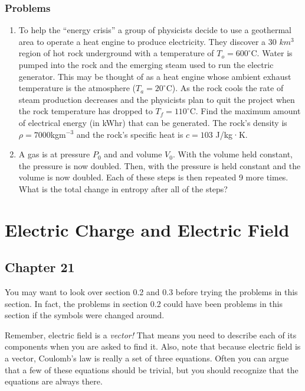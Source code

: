 \documentclass[12pt]{book}
\begin{document}
\subsection{Problems}

\begin{enumerate}
 \item To help the “energy crisis” a group of physicists decide to use a geothermal area to operate a heat engine
to produce electricity. They discover a 30 $km^3$ region of hot rock underground with a temperature of
$T_o = 600^{\circ}$C. Water is pumped into the rock and the emerging steam used to run the electric generator.
This may be thought of as a heat engine whose ambient exhaust temperature is the atmosphere ($T_a =
20^{\circ}$C). As the rock cools the rate of steam production decreases and the physicists plan to quit the project
when the rock temperature has dropped to $T_f = 110^{\circ}$C. Find the maximum amount of electrical energy
(in kWhr) that can be generated. The rock’s density is $\rho = 7000 $kgm$^{-3}$ and the rock’s specific heat is
$c = 103$ J/kg·K.
\item A gas is at pressure $P_0$ and and volume $V_0.$ With the volume held constant, the pressure is now doubled. Then, with the pressure is held constant and the volume is now doubled. Each of these steps is then repeated 9 more times. What is the total change in entropy after all of the steps?
\end{enumerate}


\chapter{Electric Charge and Electric Field}

\section{Chapter 21}

You may want to look over section 0.2 and 0.3 before trying the problems in this section. In fact, the problems in section 0.2 could have been problems in this section if the symbols were changed around.

Remember, electric field is a {\it vector!} That means you need to describe each of its components when you are asked to find it. Also, note that because electric field is a vector, Coulomb's law is really a set of three equations. Often you can argue that a few of these equations should be trivial, but you should recognize that the equations are always there.
\end{document}
